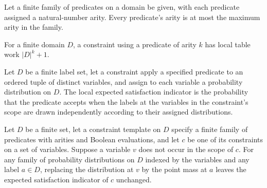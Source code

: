 \begin{theorem}
\label{FABL.CSPTemplate.arity_le_maxArity}
\leanok
{}
Let a finite family of predicates on a domain be given, with each predicate assigned a
natural-number arity. Every predicate's arity is at most the maximum arity in the
family.
\end{theorem}

\begin{definition}
\label{FABL.CSPConstraint.localTableWork}
\leanok
{}
For a finite domain $D$, a constraint using a predicate of arity $k$ has local table
work $|D|^k+1$.
\end{definition}

\begin{definition}
\label{FABL.CSPConstraint.localExpectedIndicator}
\leanok
{}
Let $D$ be a finite label set, let a constraint apply a specified predicate to an
ordered tuple of distinct variables, and assign to each variable a probability
distribution on $D$. The local expected satisfaction indicator is the probability that
the predicate accepts when the labels at the variables in the constraint’s scope are
drawn independently according to their assigned distributions.
\end{definition}

\begin{theorem}
\label{FABL.CSPConstraint.localExpectedIndicator_replace_of_not_mem}
\leanok
{}
Let $D$ be a finite set, let a constraint template on $D$ specify a finite family of
predicates with arities and Boolean evaluations, and let $c$ be one of its constraints
on a set of variables. Suppose a variable $v$ does not occur in the scope of $c$. For
any family of probability distributions on $D$ indexed by the variables and any label
$a\in D$, replacing the distribution at $v$ by the point mass at $a$ leaves the expected
satisfaction indicator of $c$ unchanged.
\end{theorem}

